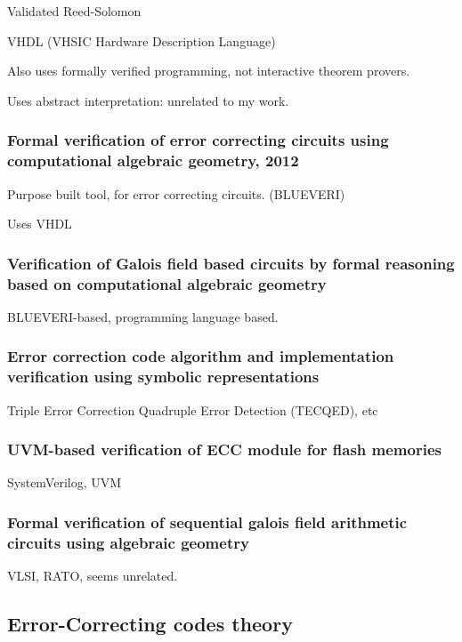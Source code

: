 \documentclass{article}
\begin{document}
Validated Reed-Solomon

VHDL (VHSIC Hardware Description Language)

Also uses formally verified programming, not interactive theorem provers.

Uses abstract interpretation: unrelated to my work.

\subsubsection{Formal verification of error correcting circuits using computational algebraic geometry, 2012}

Purpose built tool, for error correcting circuits. (BLUEVERI)

Uses VHDL

\subsubsection{Verification of Galois field based circuits by formal reasoning based on computational algebraic geometry}

BLUEVERI-based, programming language based.

\subsubsection{Error correction code algorithm and implementation verification using symbolic representations}

 Triple Error Correction Quadruple Error Detection (TECQED), etc

\subsubsection{UVM-based verification of ECC module for flash memories}

SystemVerilog, UVM

\subsubsection{Formal verification of sequential galois field arithmetic circuits using algebraic geometry}

VLSI, RATO, seems unrelated.


\subsection{Error-Correcting codes theory}
\end{document}
